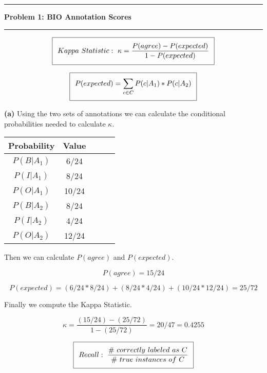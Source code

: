 \documentclass[11pt]{article}
\newcommand\question[2]{\vspace{.25in}\hrule\textbf{#1: #2}\vspace{.5em}\hrule\vspace{.10in}}
\renewcommand\part[1]{\vspace{.10in}\textbf{(#1)}}
\begin{document}
\raggedright

\newcommand\NAME{Jake Pitkin}
\newcommand\UID{u0891770}
\newcommand\HWNUM{1}

\question{Problem 1}{BIO Annotation Scores}

\begin{equation}
\setlength\fboxsep{0.25cm}
\setlength\fboxrule{0.4pt}
\boxed{Kappa \ Statistic: \ \kappa = \frac{P(agree) - P(expected)}{1 - P(expected)}}
\end{equation}

\begin{equation}
\setlength\fboxsep{0.25cm}
\setlength\fboxrule{0.4pt}
\boxed{P(expected) = \sum_{c \in C} P(c | A_1) * P(c | A_2)}
\end{equation}

\part{a} Using the two sets of annotations we can calculate the conditional probabilities needed to calculate $\kappa$.

\begin{table}[H]
\centering
{\renewcommand{\arraystretch}{1.2}%
\begin{tabular}{| c | c | c | c | c |}
\hline
Probability & Value \\
\hline
$P(B|A_1)$ & 6/24\\ \hline
$P(I|A_1)$ & 8/24\\ \hline
$P(O|A_1)$ & 10/24\\ \hline
$P(B|A_2)$ & 8/24\\ \hline
$P(I|A_2)$ & 4/24\\ \hline
$P(O|A_2)$ & 12/24\\ \hline
\end{tabular}}
\end{table}

Then we can calculate $P(agree)$ and $P(expected)$.

$$P(agree) = 15/24$$

$$P(expected) = (6/24 * 8/24) + (8/24 * 4/24) + (10/24 * 12/24) = 25/72$$

Finally we compute the Kappa Statistic.

$$\kappa = \frac{(15/24) - (25/72)}{1 - (25/72)} = 20/47 = 0.4255$$


\begin{equation}
\setlength\fboxsep{0.25cm}
\setlength\fboxrule{0.4pt}
\boxed{Recall: \ \frac{\# \ correctly \ labeled \ as \ C}{\# \ true \  instances \ of \ C}}
\end{equation}
\end{document}
